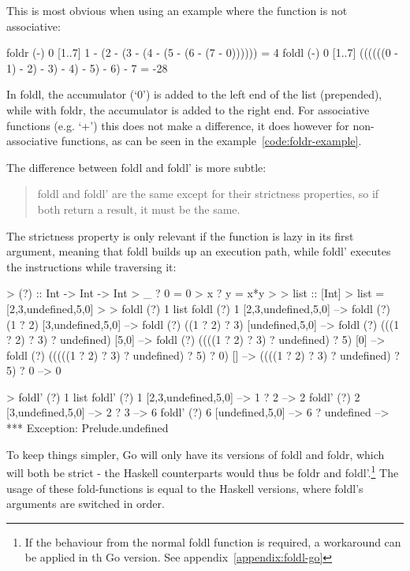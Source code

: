 This is most obvious when using an example where the function is not associative:

\begin{code}
    \label{code:foldr-example}
    \begin{haskellcode}
foldr (-) 0 [1..7]
1 - (2 - (3 - (4 - (5 - (6 - (7 - 0)))))) = 4
foldl (-) 0 [1..7]
((((((0 - 1) - 2) - 3) - 4) - 5) - 6) - 7 = -28
    \end{haskellcode}
\end{code}
In foldl, the accumulator (`0') is added to the left end of the list (prepended),
while with foldr, the accumulator is added to the right end.
For associative functions (e.g. `+') this does not make a difference, it does
however for non-associative functions, as can be seen in the example~\ref{code:foldr-example}.

The difference between foldl and foldl' is more subtle:
\begin{quote}
    foldl and foldl' are the same except for their strictness properties, so if both
    return a result, it must be the same.\autocite{fold-types}
\end{quote}

The strictness property is only relevant if the function is lazy in its first argument,
meaning that foldl builds up an execution path, while foldl' executes the instructions
while traversing it:

\begin{code}
    \begin{haskellcode}
> (?) :: Int -> Int -> Int
> _ ? 0 = 0
> x ? y = x*y
>
> list :: [Int]
> list = [2,3,undefined,5,0]
>
> foldl (?) 1 list
foldl (?) 1 [2,3,undefined,5,0] -->
foldl (?) (1 ? 2) [3,undefined,5,0] -->
foldl (?) ((1 ? 2) ? 3) [undefined,5,0] -->
foldl (?) (((1 ? 2) ? 3) ? undefined) [5,0] -->
foldl (?) ((((1 ? 2) ? 3) ? undefined) ? 5) [0] -->
foldl (?) (((((1 ? 2) ? 3) ? undefined) ? 5) ? 0) [] -->
((((1 ? 2) ? 3) ? undefined) ? 5) ? 0 -->
0

> foldl' (?) 1 list
foldl' (?) 1 [2,3,undefined,5,0] -->
    1 ? 2 --> 2
foldl' (?) 2 [3,undefined,5,0] -->
    2 ? 3 --> 6
foldl' (?) 6 [undefined,5,0] -->
    6 ? undefined -->
*** Exception: Prelude.undefined
    \end{haskellcode}
\end{code}
To keep things simpler, Go will only have its versions of foldl and foldr, which
will both be strict - the Haskell counterparts would thus be foldr and foldl'.\footnote{
If the behaviour from the normal foldl function is required, a workaround can
be applied in th Go version. See appendix~\ref{appendix:foldl-go}
}
The usage of these fold-functions is equal to the Haskell versions, where foldl's
arguments are switched in order.

